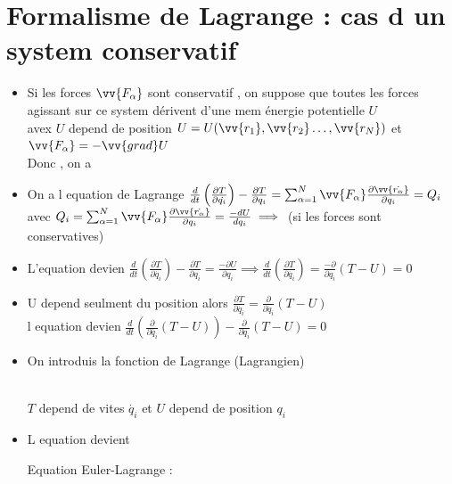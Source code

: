 \documentclass[12pt,oneside]{book}
\begin{document}
\section{Formalisme de Lagrange : cas d un system conservatif}
\begin{itemize}
	\item Si les forces $\vv{F_\alpha}$ sont conservatif , on suppose que toutes les forces agissant sur ce system dérivent d'une mem énergie potentielle $U$ \\
	      avex $U$ depend de position $U = U(\vv{r_1}, \vv{r_2}\ldots , \vv{r_N})$ et $\vv{F_\alpha}=-\vv{grad}U$ \\
	      Donc , on a 
	\item On a l equation de Lagrange $\frac{d}{dt}\left( \frac{\partial T}{\partial \dot{q_i}} \right) - \frac{\partial T}{\partial q_i} = \sum^N_{\alpha = 1}\vv{F_\alpha}\frac{\partial\vv{\dot{r_\alpha}}}{\partial q_i} = Q_i$ \\
	      avec $Q_i =\sum^N_{\alpha = 1}\vv{F_\alpha}\frac{\partial\vv{\dot{r_\alpha}}}{\partial q_i} = \frac{-dU}{dq_i}\implies $ (si les forces sont conservatives)
	\item L'equation devien $\frac{d}{dt}\left( \frac{\partial T}{\partial \dot{q_i}} \right) - \frac{\partial T}{\partial q_i} = \frac{-\partial U}{\partial q_i} \implies \frac{d}{dt}\left( \frac{\partial T}{\partial \dot{q_i}} \right) = \frac{-\partial}{\partial q_i}(T-U) =0$
	\item U depend seulment du position alors $\frac{\partial T}{\partial \dot{q_i}} = \frac{\partial}{\partial \dot{q_i}}(T-U)$ \\
	      l equation devien $\frac{d}{dt}\left( \frac{\partial}{\partial \dot{q_i}}(T-U) \right) - \frac{\partial}{\partial q_i} (T-U) =0$
	\item On introduis la fonction de Lagrange (Lagrangien) \\
	      \begin{center}
		       \\
		      $T$ depend de vites $\dot{q_i}$ et $U$ depend de position $q_i$
	      \end{center}
	\item L equation devient \\
	      \begin{center}
		      Equation Euler-Lagrange : 
	      \end{center}
\end{itemize}
\end{document}
